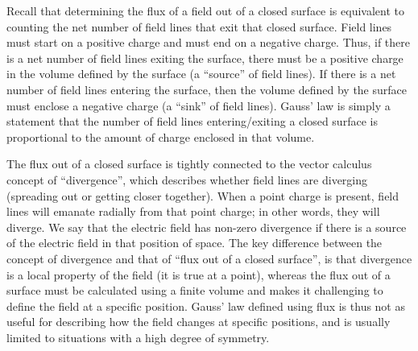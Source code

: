 Recall that determining the flux of a field out of a closed surface is equivalent to counting the net number of field lines that exit that closed surface. Field lines must start on a positive charge and must end on a negative charge. Thus, if there is a net number of field lines exiting the surface, there must be a positive charge in the volume defined by the surface (a ``source'' of field lines). If there is a net number of field lines entering the surface, then the volume defined by the surface must enclose a negative charge (a ``sink'' of field lines). Gauss' law is simply a statement that the number of field lines entering/exiting a closed surface is proportional to the amount of charge enclosed in that volume.

The flux out of a closed surface is tightly connected to the vector calculus concept of ``divergence'', which describes whether field lines are diverging (spreading out or getting closer together). When a point charge is present, field lines will emanate radially from that point charge; in other words, they will diverge. We say that the electric field has non-zero divergence if there is a source of the electric field in that position of space. The key difference between the concept of divergence and that of ``flux out of a closed surface'', is that divergence is a local property of the field (it is true at a point), whereas the flux out of a surface must be calculated using a finite volume and makes it challenging to define the field at a specific position. Gauss' law defined using flux is thus not as useful for describing how the field changes at specific positions, and is usually limited to situations with a high degree of symmetry.

